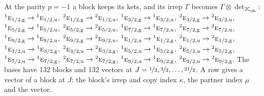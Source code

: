 \documentclass[10pt,a4paper]{article}
\numberwithin{equation}{section}
\newcommand{\grp}[1]{\mathsf{#1}}
\newcommand{\irr}[1]{\text{\normalfont\scshape #1}}
\newcommand{\conjpair}[1]{{}^{#1}}
\newcommand{\ptag}[1]{\mathrm{#1}}
\newcommand{\irrprod}{\otimes}
\newcommand{\mult}{\kappa}
\newcommand{\intx}{\mu}
\begin{document}
At the parity $p = -1$ a block keeps its kets, and its irrep $\Gamma$ becomes $\Gamma \irrprod \det_{\grp{2C_{10h}}}$: $\conjpair{1}\irr{e}_{1/2,\ptag{g}} \to \conjpair{1}\irr{e}_{1/2,\ptag{u}}$, $\conjpair{2}\irr{e}_{1/2,\ptag{g}} \to \conjpair{2}\irr{e}_{1/2,\ptag{u}}$, $\conjpair{1}\irr{e}_{3/2,\ptag{g}} \to \conjpair{1}\irr{e}_{3/2,\ptag{u}}$, $\conjpair{2}\irr{e}_{3/2,\ptag{g}} \to \conjpair{2}\irr{e}_{3/2,\ptag{u}}$, $\conjpair{1}\irr{e}_{5/2,\ptag{g}} \to \conjpair{1}\irr{e}_{5/2,\ptag{u}}$, $\conjpair{2}\irr{e}_{5/2,\ptag{g}} \to \conjpair{2}\irr{e}_{5/2,\ptag{u}}$, $\conjpair{1}\irr{e}_{7/2,\ptag{g}} \to \conjpair{1}\irr{e}_{7/2,\ptag{u}}$, $\conjpair{2}\irr{e}_{7/2,\ptag{g}} \to \conjpair{2}\irr{e}_{7/2,\ptag{u}}$, $\conjpair{1}\irr{e}_{9/2,\ptag{g}} \to \conjpair{1}\irr{e}_{9/2,\ptag{u}}$, $\conjpair{2}\irr{e}_{9/2,\ptag{g}} \to \conjpair{2}\irr{e}_{9/2,\ptag{u}}$, $\conjpair{1}\irr{e}_{1/2,\ptag{u}} \to \conjpair{1}\irr{e}_{1/2,\ptag{g}}$, $\conjpair{2}\irr{e}_{1/2,\ptag{u}} \to \conjpair{2}\irr{e}_{1/2,\ptag{g}}$, $\conjpair{1}\irr{e}_{3/2,\ptag{u}} \to \conjpair{1}\irr{e}_{3/2,\ptag{g}}$, $\conjpair{2}\irr{e}_{3/2,\ptag{u}} \to \conjpair{2}\irr{e}_{3/2,\ptag{g}}$, $\conjpair{1}\irr{e}_{5/2,\ptag{u}} \to \conjpair{1}\irr{e}_{5/2,\ptag{g}}$, $\conjpair{2}\irr{e}_{5/2,\ptag{u}} \to \conjpair{2}\irr{e}_{5/2,\ptag{g}}$, $\conjpair{1}\irr{e}_{7/2,\ptag{u}} \to \conjpair{1}\irr{e}_{7/2,\ptag{g}}$, $\conjpair{2}\irr{e}_{7/2,\ptag{u}} \to \conjpair{2}\irr{e}_{7/2,\ptag{g}}$, $\conjpair{1}\irr{e}_{9/2,\ptag{u}} \to \conjpair{1}\irr{e}_{9/2,\ptag{g}}$, $\conjpair{2}\irr{e}_{9/2,\ptag{u}} \to \conjpair{2}\irr{e}_{9/2,\ptag{g}}$.
The bases have 132 blocks and 132 vectors at $J = \nicefrac{1}{2}, \nicefrac{3}{2}, \dots, \nicefrac{21}{2}$. \label{n:index.copy}\label{n:head.vector}A row gives a vector of a block at $J$: the block's irrep and copy index $\mult$, the partner index $\intx$ and the vector.
\end{document}
